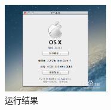 \documentclass{article}
\begin{document}
\begin{enumerate}
\begin{figure}[!htb]
\includegraphics[width=0.4\textwidth]{figures/tu219.png}
\caption{\small 运行结果}
\label{tu218}
\end{figure} 
\end{enumerate}
\end{document}
